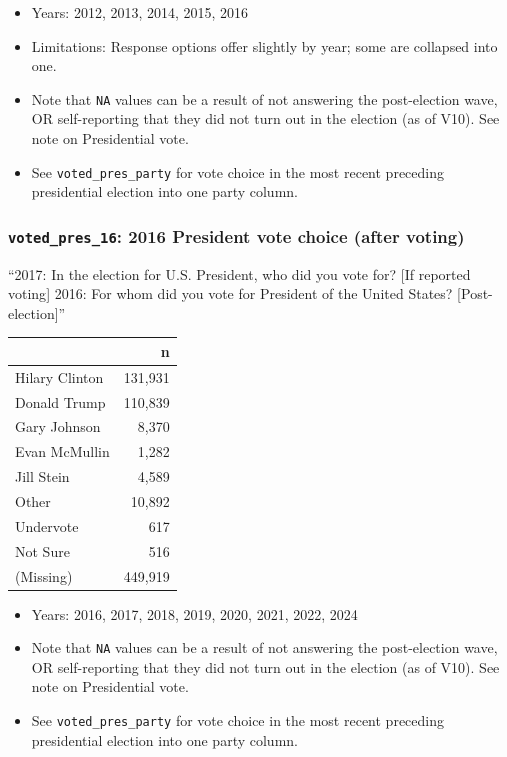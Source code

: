 \documentclass[10pt,article,oneside]{memoir}
\begin{document}
\begin{itemize}
\tightlist
\item
  Years: 2012, 2013, 2014, 2015, 2016
\item
  Limitations: Response options offer slightly by year; some are
  collapsed into one.
\item
  Note that \texttt{NA} values can be a result of not answering the
  post-election wave, OR self-reporting that they did not turn out in
  the election (as of V10). See note on Presidential vote.
\item
  See \texttt{voted\_pres\_party} for vote choice in the most recent
  preceding presidential election into one party column.
\end{itemize}

\subsubsection{\texorpdfstring{\texttt{voted\_pres\_16}: 2016 President
vote choice (after
voting)}{voted\_pres\_16: 2016 President vote choice (after voting)}}\label{voted_pres_16-2016-president-vote-choice-after-voting}

``2017: In the election for U.S. President, who did you vote for? {[}If
reported voting{]} 2016: For whom did you vote for President of the
United States? {[}Post-election{]}''

\begin{table}[H]
\centering
\begin{tabular}[t]{lr}
\toprule
 & n\\
\midrule
Hilary Clinton & 131,931\\
Donald Trump & 110,839\\
Gary Johnson & 8,370\\
Evan McMullin & 1,282\\
Jill Stein & 4,589\\
Other & 10,892\\
Undervote & 617\\
Not Sure & 516\\
(Missing) & 449,919\\
\bottomrule
\end{tabular}
\end{table}

\begin{itemize}
\tightlist
\item
  Years: 2016, 2017, 2018, 2019, 2020, 2021, 2022, 2024
\item
  Note that \texttt{NA} values can be a result of not answering the
  post-election wave, OR self-reporting that they did not turn out in
  the election (as of V10). See note on Presidential vote.
\item
  See \texttt{voted\_pres\_party} for vote choice in the most recent
  preceding presidential election into one party column.
\end{itemize}
\end{document}

